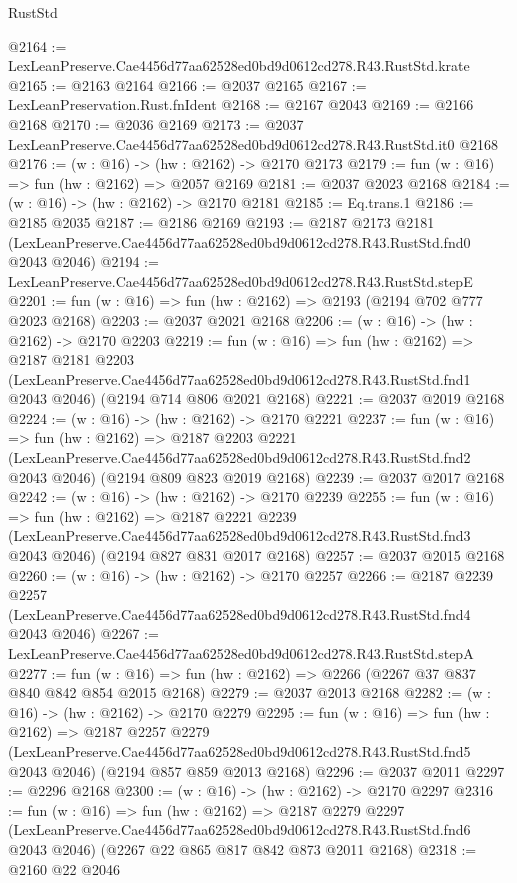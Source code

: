 \begin{lexlean}{RustStd}
\begin{coremodule}
@2164 := LexLeanPreserve.Cae4456d77aa62528ed0bd9d0612cd278.R43.RustStd.krate
@2165 := @2163 @2164
@2166 := @2037 @2165
@2167 := LexLeanPreservation.Rust.fnIdent
@2168 := @2167 @2043
@2169 := @2166 @2168
@2170 := @2036 @2169
@2173 := @2037 LexLeanPreserve.Cae4456d77aa62528ed0bd9d0612cd278.R43.RustStd.it0 @2168
@2176 := (w : @16) -> (hw : @2162) -> @2170 @2173
@2179 := fun (w : @16) => fun (hw : @2162) => @2057 @2169
@2181 := @2037 @2023 @2168
@2184 := (w : @16) -> (hw : @2162) -> @2170 @2181
@2185 := Eq.trans.{1}
@2186 := @2185 @2035
@2187 := @2186 @2169
@2193 := @2187
    @2173
    @2181
    (LexLeanPreserve.Cae4456d77aa62528ed0bd9d0612cd278.R43.RustStd.fnd0 @2043 @2046)
@2194 := LexLeanPreserve.Cae4456d77aa62528ed0bd9d0612cd278.R43.RustStd.stepE
@2201 := fun (w : @16) => fun (hw : @2162) => @2193 (@2194 @702 @777 @2023 @2168)
@2203 := @2037 @2021 @2168
@2206 := (w : @16) -> (hw : @2162) -> @2170 @2203
@2219 := fun (w : @16) =>
  fun (hw : @2162) =>
  @2187
    @2181
    @2203
    (LexLeanPreserve.Cae4456d77aa62528ed0bd9d0612cd278.R43.RustStd.fnd1 @2043 @2046)
    (@2194 @714 @806 @2021 @2168)
@2221 := @2037 @2019 @2168
@2224 := (w : @16) -> (hw : @2162) -> @2170 @2221
@2237 := fun (w : @16) =>
  fun (hw : @2162) =>
  @2187
    @2203
    @2221
    (LexLeanPreserve.Cae4456d77aa62528ed0bd9d0612cd278.R43.RustStd.fnd2 @2043 @2046)
    (@2194 @809 @823 @2019 @2168)
@2239 := @2037 @2017 @2168
@2242 := (w : @16) -> (hw : @2162) -> @2170 @2239
@2255 := fun (w : @16) =>
  fun (hw : @2162) =>
  @2187
    @2221
    @2239
    (LexLeanPreserve.Cae4456d77aa62528ed0bd9d0612cd278.R43.RustStd.fnd3 @2043 @2046)
    (@2194 @827 @831 @2017 @2168)
@2257 := @2037 @2015 @2168
@2260 := (w : @16) -> (hw : @2162) -> @2170 @2257
@2266 := @2187
    @2239
    @2257
    (LexLeanPreserve.Cae4456d77aa62528ed0bd9d0612cd278.R43.RustStd.fnd4 @2043 @2046)
@2267 := LexLeanPreserve.Cae4456d77aa62528ed0bd9d0612cd278.R43.RustStd.stepA
@2277 := fun (w : @16) => fun (hw : @2162) => @2266 (@2267 @37 @837 @840 @842 @854 @2015 @2168)
@2279 := @2037 @2013 @2168
@2282 := (w : @16) -> (hw : @2162) -> @2170 @2279
@2295 := fun (w : @16) =>
  fun (hw : @2162) =>
  @2187
    @2257
    @2279
    (LexLeanPreserve.Cae4456d77aa62528ed0bd9d0612cd278.R43.RustStd.fnd5 @2043 @2046)
    (@2194 @857 @859 @2013 @2168)
@2296 := @2037 @2011
@2297 := @2296 @2168
@2300 := (w : @16) -> (hw : @2162) -> @2170 @2297
@2316 := fun (w : @16) =>
  fun (hw : @2162) =>
  @2187
    @2279
    @2297
    (LexLeanPreserve.Cae4456d77aa62528ed0bd9d0612cd278.R43.RustStd.fnd6 @2043 @2046)
    (@2267 @22 @865 @817 @842 @873 @2011 @2168)
@2318 := @2160 @22 @2046

\end{coremodule}
\end{lexlean}
